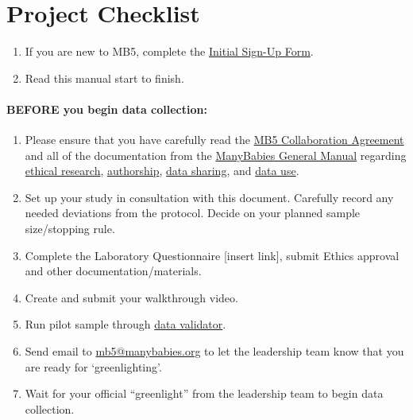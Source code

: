 \documentclass[
]{book}
\providecommand{\tightlist}{%
  \setlength{\itemsep}{0pt}\setlength{\parskip}{0pt}}
\theoremstyle{definition}
\theoremstyle{definition}
\theoremstyle{definition}
\theoremstyle{definition}
\theoremstyle{remark}
\begin{document}
\hypertarget{project-checklist}{%
\section{Project Checklist}\label{project-checklist}}

\begin{enumerate}
\def\labelenumi{\arabic{enumi}.}
\tightlist
\item
  If you are new to MB5, complete the \href{https://docs.google.com/forms/d/e/1FAIpQLSdJnP3KO_dCmj-jNPHs0XP2j3q66g1RI6L31dwhCzhwhoJeoA/viewform}{Initial Sign-Up Form}.
\item
  Read this manual start to finish.
\end{enumerate}

\hypertarget{before-you-begin-data-collection}{%
\paragraph*{BEFORE you begin data collection:}\label{before-you-begin-data-collection}}

\begin{enumerate}
\def\labelenumi{\arabic{enumi}.}
\setcounter{enumi}{2}
\tightlist
\item
  Please ensure that you have carefully read the \href{https://docs.google.com/document/d/1vbTDmH6euda5pJN4uyds3zsnQ1DXrW9wpHogwC-5TSk/edit?usp=sharing}{MB5 Collaboration Agreement} and all of the documentation from the \href{https://docs.google.com/document/d/1dZ3sF2UcxvpkfOfKSKFeObTMZRbpUYloMUiPYtZy0ng/edit?usp=sharing}{ManyBabies General Manual} regarding \href{https://docs.google.com/document/d/1dZ3sF2UcxvpkfOfKSKFeObTMZRbpUYloMUiPYtZy0ng/edit\#heading=h.22i70rxou3ha}{ethical research}, \href{https://docs.google.com/document/d/1dZ3sF2UcxvpkfOfKSKFeObTMZRbpUYloMUiPYtZy0ng/edit\#heading=h.9ty2g48mpe0t}{authorship}, \href{https://docs.google.com/document/d/1dZ3sF2UcxvpkfOfKSKFeObTMZRbpUYloMUiPYtZy0ng/edit\#heading=h.aunbjkpwxhf3}{data sharing}, and \href{https://docs.google.com/document/d/1dZ3sF2UcxvpkfOfKSKFeObTMZRbpUYloMUiPYtZy0ng/edit\#heading=h.6h67zsyeiveg}{data use}.
\item
  Set up your study in consultation with this document. Carefully record any needed deviations from the protocol. Decide on your planned sample size/stopping rule.
\item
  Complete the Laboratory Questionnaire {[}insert link{]}, submit Ethics approval and other documentation/materials.
\item
  Create and submit your walkthrough video.
\item
  Run pilot sample through \href{https://manybabies.org/validator/}{data validator}.
\item
  Send email to \url{mb5@manybabies.org} to let the leadership team know that you are ready for `greenlighting'.
\item
  Wait for your official ``greenlight'' from the leadership team to begin data collection.
\end{enumerate}
\end{document}
